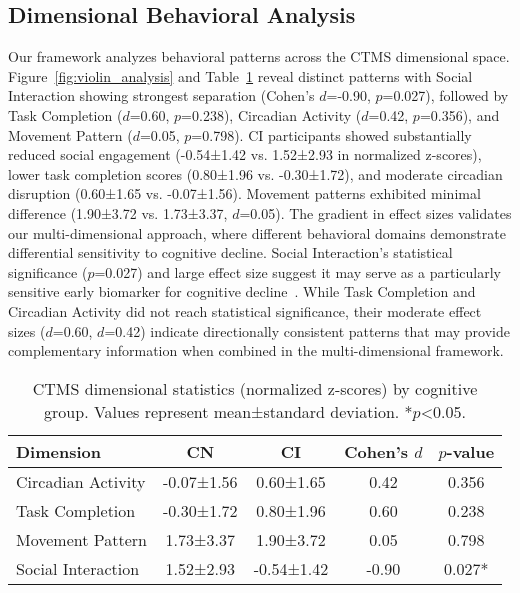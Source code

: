 \documentclass[sigconf, anonymous, 9pt, nonacm]{acmart}
\begin{document}
\subsection{Dimensional Behavioral Analysis}

Our framework analyzes behavioral patterns across the CTMS dimensional space. Figure~\ref{fig:violin_analysis} and Table~\ref{tab:dimensional_stats} reveal distinct patterns with Social Interaction showing strongest separation (Cohen's $d$=-0.90, $p$=0.027), followed by Task Completion ($d$=0.60, $p$=0.238), Circadian Activity ($d$=0.42, $p$=0.356), and Movement Pattern ($d$=0.05, $p$=0.798).
CI participants showed substantially reduced social engagement (-0.54±1.42 vs. 1.52±2.93 in normalized z-scores), lower task completion scores (0.80±1.96 vs. -0.30±1.72), and moderate circadian disruption (0.60±1.65 vs. -0.07±1.56). Movement patterns exhibited minimal difference (1.90±3.72 vs. 1.73±3.37, $d$=0.05). The gradient in effect sizes validates our multi-dimensional approach, where different behavioral domains demonstrate differential sensitivity to cognitive decline. Social Interaction's statistical significance ($p$=0.027) and large effect size suggest it may serve as a particularly sensitive early biomarker for cognitive decline~\cite{Shafighi2023SocialIsolationAD}. While Task Completion and Circadian Activity did not reach statistical significance, their moderate effect sizes ($d$=0.60, $d$=0.42) indicate directionally consistent patterns that may provide complementary information when combined in the multi-dimensional framework.


\begin{table}[t]
\centering
\small
\begin{tabular}{lcccc}
\toprule
\textbf{Dimension} & \textbf{CN} & \textbf{CI} & \textbf{Cohen's $d$} & \textbf{$p$-value} \\
\midrule
Circadian Activity & -0.07±1.56 & 0.60±1.65 & 0.42 & 0.356 \\
Task Completion & -0.30±1.72 & 0.80±1.96 & 0.60 & 0.238 \\
Movement Pattern & 1.73±3.37 & 1.90±3.72 & 0.05 & 0.798 \\
Social Interaction & 1.52±2.93 & -0.54±1.42 & -0.90 & 0.027* \\
\bottomrule
\end{tabular}
\caption{CTMS dimensional statistics (normalized z-scores) by cognitive group. Values represent mean±standard deviation. *$p$<0.05.}
\label{tab:dimensional_stats}
\vspace{-3em}
\end{table}
\end{document}
